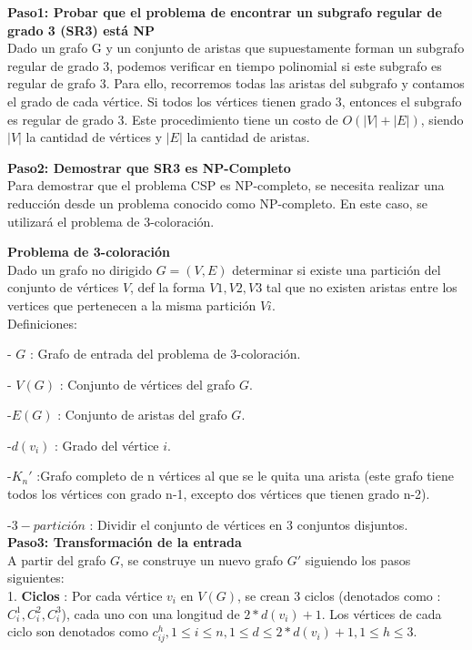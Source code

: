 \documentclass[
10pt, %
a4paper, %
oneside, %
headinclude,footinclude, %
BCOR5mm, %
]{scrartcl}
\begin{document}
\textbf{Paso1: Probar que el problema de encontrar un subgrafo regular de grado 3 (SR3) está NP }\\


Dado un grafo G y un conjunto de aristas que supuestamente forman un subgrafo regular de grado 3, podemos verificar en 
tiempo polinomial si este subgrafo es regular de grafo 3. Para ello, recorremos todas las aristas del subgrafo y contamos el grado de
cada vértice. Si todos los vértices tienen grado 3, entonces el subgrafo es regular de grado 3. Este procedimiento tiene un costo de 
$O(|V|+|E|)$, siendo $|V|$ la cantidad de vértices y $|E|$ la cantidad de aristas.


\textbf{Paso2: Demostrar que SR3 es NP-Completo}\\

Para demostrar que el problema CSP es NP-completo, se necesita realizar una reducción desde un problema conocido como NP-completo. 
En este caso, se utilizará el problema de 3-coloración.


\textbf{ Problema de 3-coloración} \\


Dado un grafo no dirigido $G = (V,E)$ determinar si existe una partición del conjunto de vértices $V$,
def la forma ${V1,V2,V3}$ tal que no existen aristas entre los vertices que pertenecen a la misma partición $Vi$.\\


Definiciones:

- $G$ : Grafo de entrada del problema de 3-coloración.

- $V(G)$ : Conjunto de vértices del grafo $G$.

-$E(G)$ : Conjunto de aristas del grafo $G$. 

-$d(v_i)$ : Grado del vértice $i$.

-$K_n'$ :Grafo completo de n vértices al que se le quita una arista (este grafo tiene todos los vértices con grado n-1, excepto dos vértices que tienen grado n-2).

-$3-partición$ : Dividir el conjunto de vértices en 3 conjuntos disjuntos.\\



\textbf{Paso3: Transformación de la entrada  }\\

A partir del grafo $G$, se construye un nuevo grafo $G'$ siguiendo los pasos siguientes:\\

1. \textbf{Ciclos} : Por cada vértice $v_i$ en $V(G)$, se crean 3 ciclos (denotados como : $C^1_i, C^2_i, C^3_i$), 
cada uno con una longitud de $2*d(v_i) + 1$. Los vértices de cada ciclo son denotados como $c_{ij}^{h} , 1 \leq i \leq n , 1 \leq d \leq 2*d(v_i) + 1 , 1 \leq h \leq 3 $.\\
\end{document}
